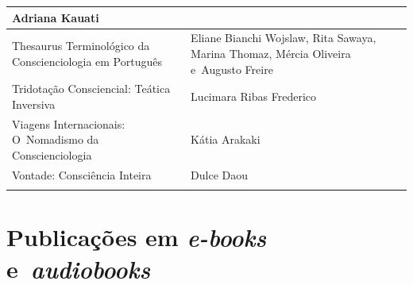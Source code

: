 \documentclass{gescons}
\begin{document}
\begin{longtable}[]{@{}
  >{\raggedright\arraybackslash}p{}
  >{\raggedright\arraybackslash}p{}@{}}
\begin{minipage}[t]{\linewidth}
Adriana Kauati
\end{minipage} \\
\hline
\begin{minipage}[t]{\linewidth}\raggedright
Thesaurus Terminológico da Conscienciologia em Português
\end{minipage} & \begin{minipage}[t]{\linewidth}\raggedright
Eliane Bianchi Wojslaw, Rita Sawaya, Marina Thomaz, Mércia Oliveira e~Augusto Freire
\end{minipage} \\
\hline
\begin{minipage}[t]{\linewidth}\raggedright
Tridotação Consciencial: Teática Inversiva
\end{minipage} & \begin{minipage}[t]{\linewidth}\raggedright
Lucimara Ribas Frederico
\end{minipage} \\
\hline
\begin{minipage}[t]{\linewidth}\raggedright
Viagens Internacionais: O~Nomadismo da Conscienciologia
\end{minipage} & \begin{minipage}[t]{\linewidth}\raggedright
Kátia Arakaki
\end{minipage} \\
\hline
\begin{minipage}[t]{\linewidth}\raggedright
Vontade: Consciência Inteira
\end{minipage} & \begin{minipage}[t]{\linewidth}\raggedright
Dulce Daou
\end{minipage} \\
\midrule\noalign{}
\endhead
\bottomrule\noalign{}
\endlastfoot
\end{longtable}



\newpage
\section*{Publicações em \emph{e-books} e~\emph{audiobooks}}
\end{document}
